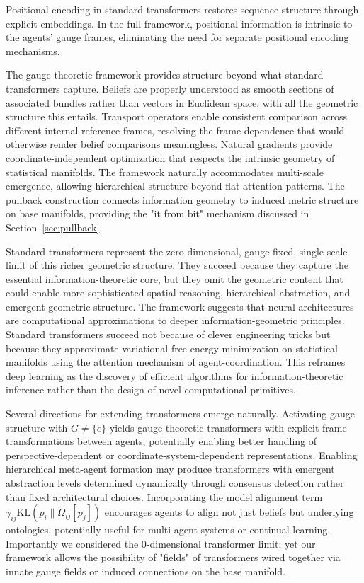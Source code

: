 \documentclass[11pt]{article}
\begin{document}
Positional encoding in standard transformers restores sequence structure through explicit embeddings. In the full framework, positional information is intrinsic to the agents' gauge frames, eliminating the need for separate positional encoding mechanisms. 

The gauge-theoretic framework provides structure beyond what standard transformers capture. Beliefs are properly understood as smooth sections of associated bundles rather than vectors in Euclidean space, with all the geometric structure this entails. Transport operators enable consistent comparison across different internal reference frames, resolving the frame-dependence that would otherwise render belief comparisons meaningless. Natural gradients provide coordinate-independent optimization that respects the intrinsic geometry of statistical manifolds. The framework naturally accommodates multi-scale emergence, allowing hierarchical structure beyond flat attention patterns. The pullback construction connects information geometry to induced metric structure on base manifolds, providing the "it from bit" mechanism discussed in Section~\ref{sec:pullback}.

Standard transformers represent the zero-dimensional, gauge-fixed, single-scale limit of this richer geometric structure. They succeed because they capture the essential information-theoretic core, but they omit the geometric content that could enable more sophisticated spatial reasoning, hierarchical abstraction, and emergent geometric structure. The framework suggests that neural architectures are computational approximations to deeper information-geometric principles. Standard transformers succeed not because of clever engineering tricks but because they approximate variational free energy minimization on statistical manifolds using the attention mechanism of agent-coordination. This reframes deep learning as the discovery of efficient algorithms for information-theoretic inference rather than the design of novel computational primitives.

Several directions for extending transformers emerge naturally. Activating gauge structure with $G \neq \{e\}$ yields gauge-theoretic transformers with explicit frame transformations between agents, potentially enabling better handling of perspective-dependent or coordinate-system-dependent representations.  Enabling hierarchical meta-agent formation may produce transformers with emergent abstraction levels determined dynamically through consensus detection rather than fixed architectural choices. Incorporating the model alignment term $\gamma_{ij} \mathrm{KL}(p_i \| \tilde{\Omega}_{ij}[p_j])$ encourages agents to align not just beliefs but underlying ontologies, potentially useful for multi-agent systems or continual learning. Importantly we considered the 0-dimensional transformer limit; yet our framework allows the possibility of "fields" of transformers wired together via innate gauge fields or induced connections on the base manifold.
\end{document}
